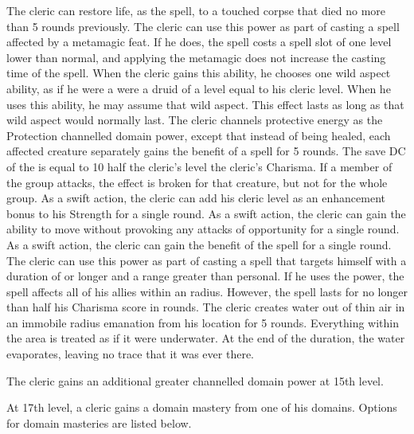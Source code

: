  The cleric can restore life, as the  spell, to a touched corpse that died no more than 5 rounds previously.
 The cleric can use this power as part of casting a spell affected by a metamagic feat. If he does, the spell costs a spell slot of one level lower than normal, and applying the metamagic does not increase the casting time of the spell.
 When the cleric gains this ability, he chooses one wild aspect ability, as if he were a were a druid of a level equal to his cleric level. When he uses this ability, he may assume that wild aspect. This effect lasts as long as that wild aspect would normally last.
 The cleric channels protective energy as the Protection channelled domain power, except that instead of being healed, each affected creature separately gains the benefit of a  spell for 5 rounds. The save DC of the  is equal to 10 \add half the cleric's level \add the cleric's Charisma. If a member of the group attacks, the effect is broken for that creature, but not for the whole group.
 As a swift action, the cleric can add his cleric level as an enhancement bonus to his Strength for a single round.
 As a swift action, the cleric can gain the ability to move without provoking any attacks of opportunity for a single round.
 As a swift action, the cleric can gain the benefit of the  spell for a single round.
 The cleric can use this power as part of casting a spell that targets himself with a duration of \durshort or longer and a range greater than personal. If he uses the power, the spell affects all of his allies within an \areamed radius. However, the spell lasts for no longer than half his Charisma score in rounds.
 The cleric creates water out of thin air in an immobile \areamed radius emanation from his location for 5 rounds. Everything within the area is treated as if it were underwater. At the end of the duration, the water evaporates, leaving no trace that it was ever there.

\par The cleric gains an additional greater channelled domain power at 15th level.

 At 17th level, a cleric gains a domain mastery from one of his domains. Options for domain masteries are listed below.

